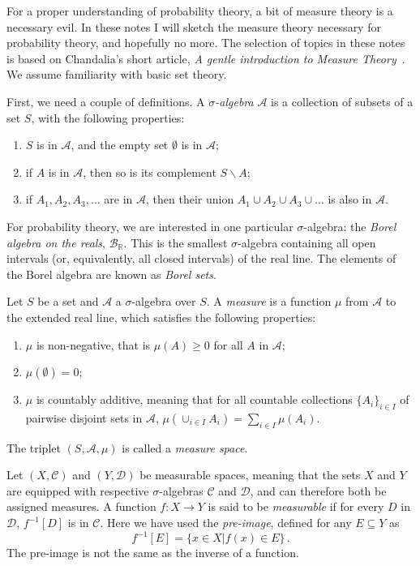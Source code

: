 For a proper understanding of probability theory, a bit of measure theory is a necessary evil. In these notes I will sketch the measure theory necessary for probability theory, and hopefully no more. The selection of topics in these notes is based on Chandalia's short article, \emph{A gentle introduction to Measure Theory}~\cite{Chandalia07agentle}. We assume familiarity with basic set theory.

First, we need a couple of definitions. A \emph{$\sigma$-algebra} $\mathcal{A}$ is a collection of subsets of a set $S$, with the following properties:
\begin{enumerate}
\item $S$ is in $\mathcal{A}$, and the empty set $\emptyset$ is in $\mathcal{A}$;
\item if $A$ is in $\mathcal{A}$, then so is its complement $S \backslash A$;
\item if $A_1, A_2, A_3, \ldots$ are in $\mathcal{A}$, then their union $A_1 \cup A_2 \cup A_3 \cup \ldots$ is also in $\mathcal{A}$.
\end{enumerate}
For probability theory, we are interested in one particular $\sigma$-algebra: the \emph{Borel algebra on the reals}, $\mathcal{B}_\mathbb{R}$. This is the smallest $\sigma$-algebra containing all open intervals (or, equivalently, all closed intervals) of the real line. The elements of the Borel algebra are known as \emph{Borel sets}.

Let $S$ be a set and $\mathcal{A}$ a $\sigma$-algebra over $S$. A \emph{measure} is a function $\mu$ from $\mathcal{A}$ to the extended real line, which satisfies the following properties:
\begin{enumerate}
\item $\mu$ is non-negative, that is $\mu(A) \geq 0$ for all $A$ in $\mathcal{A}$;
\item $\mu(\emptyset) = 0$;
\item $\mu$ is countably additive, meaning that for all countable collections ${\{A_i\}}_{i \in I}$ of pairwise disjoint sets in $\mathcal{A}$, $\mu \left( \cup_{i \in I} A_i \right) = \sum_{i \in I} \mu(A_i)$.
\end{enumerate}
The triplet $(S, \mathcal{A}, \mu)$ is called a \emph{measure space}.

Let $(X, \mathcal{C})$ and $(Y, \mathcal{D})$ be measurable spaces, meaning that the sets $X$ and $Y$ are equipped with respective $\sigma$-algebras $\mathcal{C}$ and $\mathcal{D}$, and can therefore both be assigned measures. A function $f \colon X \to Y$ is said to be \emph{measurable} if for every $D$ in $\mathcal{D}$, $f^{-1}[D]$ is in $\mathcal{C}$. Here we have used the \emph{pre-image}, defined for any $E \subseteq Y$ as
\begin{equation}
  \label{eq:1}
  f^{-1}[E] = \{ x \in X | f(x) \in E \} \,.
\end{equation}
The pre-image is not the same as the inverse of a function.

